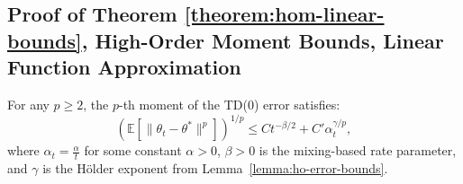 \subsection{Proof of Theorem \ref{theorem:hom-linear-bounds}, High-Order Moment Bounds, Linear Function Approximation}
\label{app:proof-hom-linear-bounds}
\begin{theoremapp*}
For any \( p \geq 2 \), the \( p \)-th moment of the TD(0) error satisfies:
\[
\left( \mathbb{E}\left[\|\theta_t - \theta^*\|^p\right] \right)^{1/p} \leq C t^{-\beta/2} + C' \alpha_t^{\gamma/p},
\]
where \( \alpha_t = \frac{\alpha}{t} \) for some constant \( \alpha > 0 \), \( \beta > 0 \) is the mixing-based rate parameter, and \( \gamma \) is the Hölder exponent from Lemma~\ref{lemma:ho-error-bounds}.
\end{theoremapp*}
